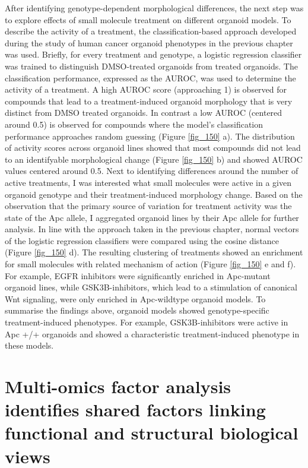 \begin{flushleft}
After identifying genotype-dependent morphological differences, the next step was to explore effects of small molecule treatment on different organoid models. To describe the activity of a treatment, the classification-based approach developed during the study of human cancer organoid phenotypes in the previous chapter was used. Briefly, for every treatment and genotype, a logistic regression classifier was trained to distinguish DMSO-treated organoids from treated organoids. The classification performance, expressed as the AUROC, was used to determine the activity of a treatment. A high AUROC score (approaching 1) is observed for compounds that lead to a treatment-induced organoid morphology that is very distinct from DMSO treated organoids. In contrast a low AUROC (centered around 0.5) is observed for compounds where the model's classification performance approaches random guessing (Figure \ref{fig_150} a). The distribution of activity scores across organoid lines showed that most compounds did not lead to an identifyable morphological change (Figure \ref{fig_150} b) and showed AUROC values centered around 0.5. Next to identifying differences around the number of active treatments, I was interested what small molecules were active in a given organoid genotype and their treatment-induced morphology change. Based on the observation that the primary source of variation for treatment activity was the state of the Apc allele, I aggregated organoid lines by their Apc allele for further analysis. In line with the approach taken in the previous chapter, normal vectors of the logistic regression classifiers were compared using the cosine distance (Figure \ref{fig_150} d). The resulting clustering of treatments showed an enrichment for small molecules with related mechanism of action (Figure \ref{fig_150} e and f). For example, EGFR inhibitors were significantly enriched in Apc-mutant organoid lines, while GSK3B-inhibitors, which lead to a stimulation of canonical Wnt signaling, were only enriched in Apc-wildtype organoid models. To summarise the findings above, organoid models showed genotype-specific treatment-induced phenotypes. For example, GSK3B-inhibitors were active in Apc +/+ organoids and showed a characteristic treatment-induced phenotype in these models.

\section{Multi-omics factor analysis identifies shared factors linking functional and structural biological views}


\end{flushleft}
